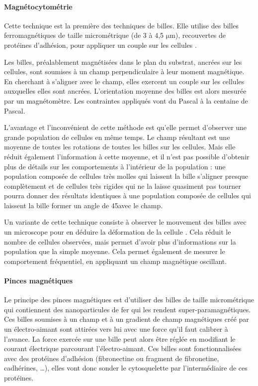 \documentclass{report}
\newcommand{\micro}{$\mathrm{\mu}$}
\begin{document}
\paragraph{Magnétocytométrie}

Cette technique est la première des techniques de billes. Elle utilise des billes ferromagnétiques de taille micrométrique (de 3 à 4,5 \micro m), recouvertes de protéines d'adhésion, pour appliquer un couple sur les cellules \cite{wang_1993}.

Les billes, préalablement magnétisées dans le plan du substrat, ancrées sur les cellules, sont soumises à un champ perpendiculaire à leur moment magnétique. En cherchant à s'aligner avec le champ, elles exercent un couple sur les cellules auxquelles elles sont ancrées. L'orientation moyenne des billes est alors mesurée par un magnétomètre. Les contraintes appliqués vont du Pascal à la centaine de Pascal. 

L'avantage et l'inconvénient de cette méthode est qu'elle permet d'observer une grande population de cellules en même temps. Le champ résultant est une moyenne de toutes les rotations de toutes les billes sur les cellules. Mais elle réduit également l'information à cette moyenne, et il n'est pas possible d'obtenir plus de détails sur les comportements à l'intérieur de la population : une population composée de cellules très molles qui laissent la bille s'aligner presque complètement et de cellules très rigides qui ne la laisse quasiment pas tourner pourra donner des résultats identiques à une population composée de cellules qui laissent la bille former un angle de 45\degres avec le champ. 

Un variante de cette technique consiste à observer le mouvement des billes avec un microscope pour en déduire la déformation de la cellule \cite{fabry}. Cela réduit le nombre de cellules observées, mais permet d'avoir plus d'informations sur la population que la simple moyenne. Cela permet également de mesurer le comportement fréquentiel, en appliquant un champ magnétique oscillant. 






\paragraph{Pinces magnétiques}

Le principe des pinces magnétiques est d'utiliser des billes de taille micrométrique qui contiennent des nanoparticules de fer qui les rendent super-paramagnétiques.
Ces billes soumises à un champ et à un gradient de champ magnétiques créé par un électro-aimant sont attirées vers lui avec une force qu'il faut calibrer à l'avance.
La force exercée sur une bille peut alors être réglée en modifiant le courant électrique parcourant l'électro-aimant.
Ces billes sont fonctionnalisées avec des protéines d'adhésion (fibronectine ou fragment de fibronetine, cadhérines, \dots), elles vont donc sonder le cytosquelette par l'intermédiaire de ces protéines. 
\end{document}
